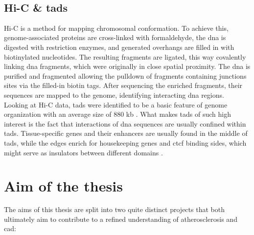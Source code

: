     \subsection{Hi-C \& \acsp{tad}}
    Hi-C is a method for mapping chromosomal conformation. To achieve this, genome-associated proteins are cross-linked with formaldehyde, the \ac{dna} is digested with restriction enzymes, and generated overhangs are filled in with biotinylated nucleotides. The resulting fragments are ligated, this way covalently linking \ac{dna} fragments, which were originally in close spatial proximity. The \ac{dna} is purified and fragmented allowing the pulldown of fragments containing junctions sites via the filled-in biotin tags. After sequencing the enriched fragments, their sequences are mapped to the genome, identifying interacting \ac{dna} regions. \cite{lieberman-aidenComprehensiveMappingLongRange2009, witDecade3CTechnologies2012}\\
    Looking at Hi-C data, \acp{tad} were identified to be a basic feature of genome organization with an average size of 880 kb \cite{dixonTopologicalDomainsMammalian2012, wang3DGenomeBrowser2018}. What makes \acp{tad} of such high interest is the fact that interactions of \ac{dna} sequences are usually confined within \acp{tad}. Tissue-specific genes and their enhancers are usually found in the middle of \acp{tad}, while the edges enrich for housekeeping genes and \ac{ctcf} binding sides, which might serve as insulators between different domains \cite{pomboThreedimensionalGenomeArchitecture2015}.


\section{Aim of the thesis}
\label{sec:Aim}
The aims of this thesis are split into two quite distinct projects that both ultimately aim to contribute to a refined understanding of atherosclerosis and \ac{cad}:

